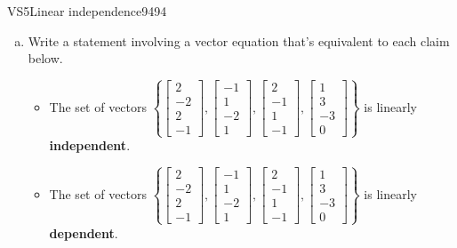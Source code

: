 \begin{exercise}{VS5}{Linear independence}{9494} 
\begin{exerciseStatement} 

\begin{enumerate}[(a)]
\item  

 Write a statement involving a vector equation that's equivalent to each claim below. 

 

\begin{itemize}
\item  

 The set of vectors \(\left\{ \left[\begin{array}{c}
2 \\
-2 \\
2 \\
-1
\end{array}\right] , \left[\begin{array}{c}
-1 \\
1 \\
-2 \\
1
\end{array}\right] , \left[\begin{array}{c}
2 \\
-1 \\
1 \\
-1
\end{array}\right] , \left[\begin{array}{c}
1 \\
3 \\
-3 \\
0
\end{array}\right] \right\}\) is linearly \textbf{independent}. 

 
\item  

 The set of vectors \(\left\{ \left[\begin{array}{c}
2 \\
-2 \\
2 \\
-1
\end{array}\right] , \left[\begin{array}{c}
-1 \\
1 \\
-2 \\
1
\end{array}\right] , \left[\begin{array}{c}
2 \\
-1 \\
1 \\
-1
\end{array}\right] , \left[\begin{array}{c}
1 \\
3 \\
-3 \\
0
\end{array}\right] \right\}\) is linearly \textbf{dependent}. 


\end{itemize}
\end{enumerate}
\end{exerciseStatement}
\end{exercise}
